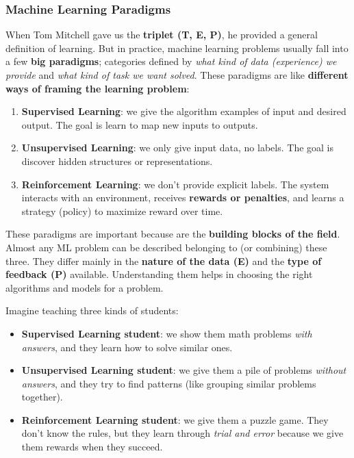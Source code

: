 \subsubsection{Machine Learning Paradigms}

When Tom Mitchell gave us the \textbf{triplet (T, E, P)}, he provided a general definition of learning. But in practice, machine learning problems usually fall into a few \textbf{big paradigms}; categories defined by \emph{what kind of data (experience) we provide} and \emph{what kind of task we want solved}. These paradigms are like \textbf{different ways of framing the learning problem}:
\begin{enumerate}
    \item \textbf{Supervised Learning}: we give the algorithm examples of input and desired output. The goal is learn to map new inputs to outputs.
    \item \textbf{Unsupervised Learning}: we only give input data, no labels. The goal is discover hidden structures or representations.
    \item \textbf{Reinforcement Learning}: we don't provide explicit labels. The system interacts with an environment, receives \textbf{rewards or penalties}, and learns a strategy (policy) to maximize reward over time.
\end{enumerate}
These paradigms are important because are the \textbf{building blocks of the field}. Almost any ML problem can be described belonging to (or combining) these three. They differ mainly in the \textbf{nature of the data (E)} and the \textbf{type of feedback (P)} available. Understanding them helps in choosing the right algorithms and models for a problem.

\begin{examplebox}[: Analogy]
    Imagine teaching three kinds of students:
    \begin{itemize}
        \item \textbf{Supervised Learning student}: we show them math problems \emph{with answers}, and they learn how to solve similar ones.
        \item \textbf{Unsupervised Learning student}: we give them a pile of problems \emph{without answers}, and they try to find patterns (like grouping similar problems together).
        \item \textbf{Reinforcement Learning student}: we give them a puzzle game. They don't know the rules, but they learn through \emph{trial and error} because we give them rewards when they succeed.
    \end{itemize}
\end{examplebox}